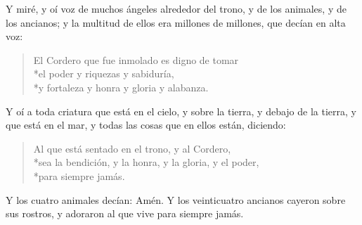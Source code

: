 Y miré, y oí voz de muchos ángeles alrededor del trono, y de los animales, y de los ancianos; y la multitud de ellos era millones de millones,%
que decían en alta voz:
\begin{verse}
El Cordero que fue inmolado es digno de tomar\\*\vin el poder y riquezas y sabiduría,\\*\vin  y fortaleza y honra y gloria y alabanza.
\end{verse}
Y oí a toda criatura que está en el cielo, y sobre la tierra, y debajo de la tierra, y que está en el mar, y todas las cosas que en ellos están, diciendo:
\begin{verse}
Al que está sentado en el trono, y al Cordero,\\*\vin sea la bendición, y la honra, y la gloria, y el poder,\\*\vin para siempre jamás.
\end{verse}
Y los cuatro animales decían: Amén. Y los veinticuatro ancianos cayeron sobre sus rostros, y adoraron al que vive para siempre jamás.
